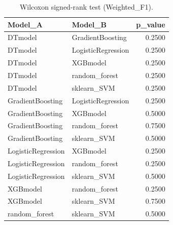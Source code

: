\begin{table}[t]
\centering
\begin{tabular}{llr}
\toprule
Model_A & Model_B & p_value \\
\midrule
DTmodel & GradientBoosting & 0.2500 \\
DTmodel & LogisticRegression & 0.2500 \\
DTmodel & XGBmodel & 0.2500 \\
DTmodel & random_forest & 0.2500 \\
DTmodel & sklearn_SVM & 0.2500 \\
GradientBoosting & LogisticRegression & 0.2500 \\
GradientBoosting & XGBmodel & 0.5000 \\
GradientBoosting & random_forest & 0.7500 \\
GradientBoosting & sklearn_SVM & 0.5000 \\
LogisticRegression & XGBmodel & 0.2500 \\
LogisticRegression & random_forest & 0.2500 \\
LogisticRegression & sklearn_SVM & 0.5000 \\
XGBmodel & random_forest & 0.2500 \\
XGBmodel & sklearn_SVM & 0.7500 \\
random_forest & sklearn_SVM & 0.5000 \\
\bottomrule
\end{tabular}
\caption{Wilcoxon signed-rank test (Weighted_F1).}
\label{tab:wilcoxon_Weighted_F1}
\end{table}
